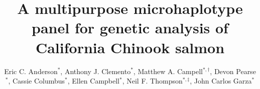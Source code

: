 

\newcommand{\myTitle}{A multipurpose microhaplotype panel for genetic analysis of California Chinook salmon}
\title{\myTitle}

\newcommand{\myAuthors}{Eric C. Anderson$^{*,\S}$, Anthony J. Clemento$^{*}$, Matthew A. Campell$^{*,\dagger}$, Devon Pearse$^{*}$, Cassie Columbus$^{*}$, Ellen Campbell$^{*}$, Neil F. Thompson$^{*,\ddag}$, John Carlos Garza$^{*}$}
\author{Eric C. Anderson$^{*}$, Anthony J. Clemento$^{*}$, Matthew A. Campell$^{*,\dagger}$, Devon Pearse$^{*}$, Cassie Columbus$^{*}$, Ellen Campbell$^{*}$, Neil F. Thompson$^{*,\ddag}$, John Carlos Garza$^{*}$}


\newcommand{\myAffiliations}{
$^*$Southwest Fisheries Science Center, National Marine Fisheries Service, NOAA, Santa Cruz, California, USA. $^\dagger$Current address: Centre for Carbon, Water and Food, The University of Sydney, 380 Werombi Road, NSW 2570, Australia. $^\ddag$Current address: Get Neil's address.
}

\renewcommand{\AuthorAddresses}{\myAffiliations}

\renewcommand{\KeyWords}{Genetic stock identfication, population assignment, parentage based tagging, amplicon sequencing}

\renewcommand{\CorrespondingAuthor}{eric.c.anderson@noaa.gov}


\newcommand{\myEmailAddress}{eric.c.anderson@noaa.gov}
\newcommand{\myEmailFootnote}{$^\S$}

\newcommand{\myCopyright}{\copyright US Federal Government work in the public domain in the USA}

\newcommand{\myRunningTitle}{Microhaplotypes for California Chinook salmon}
\renewcommand{\RunningTitle}{\myRunningTitle}

\newcommand{\myRunningAuthor}{Anderson et al.}

